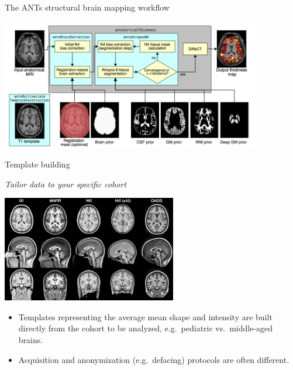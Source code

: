 \documentclass[ignorenonframetext,]{beamer}
\providecommand{\tightlist}{%
\setlength{\itemsep}{0pt}\setlength{\parskip}{0pt}}
\begin{document}
\begin{frame}{The ANTs structural brain mapping workflow}

\begin{centering}

\includegraphics[width=4.5in]{./evaluation/figures/pipeline.png}

\end{centering}

\end{frame}

\begin{frame}{Template building}

\emph{Tailor data to your specific cohort}

\begin{centering}

\includegraphics[width=3in]{./evaluation/figures/templates.png}

\end{centering}

\small

\begin{itemize}
\tightlist
\item
  Templates representing the average mean shape and intensity are built
  directly from the cohort to be analyzed, e.g.~pediatric
  vs.~middle-aged brains.\\
\item
  Acquisition and anonymization (e.g.~defacing) protocols are often
  different.
\end{itemize}

\end{frame}
\end{document}
